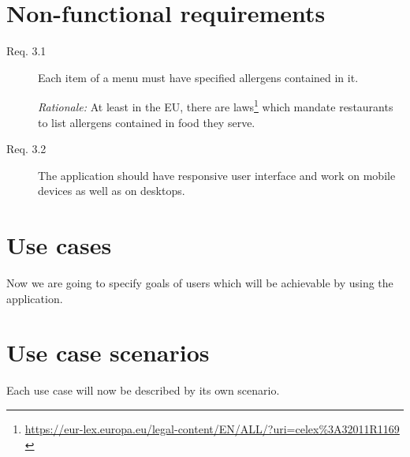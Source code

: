 \section{Non-functional requirements}
\begin{description}
    \item [Req. 3.1] Each item of a menu must have specified allergens contained in it.
    
    \emph{Rationale:} At least in the EU, there are laws\footnote{\url{https://eur-lex.europa.eu/legal-content/EN/ALL/?uri=celex\%3A32011R1169}  \label{fnlabel}} which mandate restaurants to list allergens contained in food they serve.
    \item [Req. 3.2] The application should have responsive user interface and work on mobile devices as well as on desktops.
\end{description}

\section{Use cases}
Now we are going to specify goals of users which will be achievable by using the application.


\section{Use case scenarios}
Each use case will now be described by its own scenario.